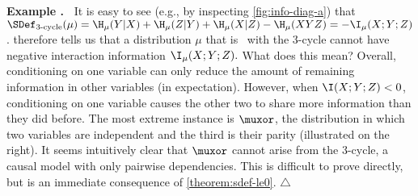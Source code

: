     \label{example:nonneg-ii}
\textbf{Example \theexample.~}
It is easy to see 
(e.g., by inspecting \cref{fig:info-diag-a}) 
that
$\SDef_{\text{3-cycle}}(\mu) = 
    \H_\mu(Y|X) + \H_\mu(Z|Y) + \H_\mu(X|Z) - \H_\mu(XYZ)
    =
    -\I_\mu(X;Y;Z)$.
%
%
 therefore tells us that 
a
distribution
    $\mu$ that is \scible\ 
    with the 3-cycle 
    cannot have negative interaction information
$
    \I_\mu(X; Y; Z)
        . 
$
What does this mean?
Overall, 
conditioning on
one variable can only reduce the amount of 
remaining information in other 
variables (in expectation).
However, when $\I(X;Y;Z) < 0$, 
conditioning on
one variable causes the other two to share more information than they did before. 
The most extreme instance is $\muxor$, the distribution in which two variables are independent and the third is their parity 
(illustrated on the right).
%
%
It seems intuitively clear that $\muxor$ cannot arise from 
the 3-cycle, a causal model with only pairwise dependencies.
This is difficult to prove directly, but is an immediate consequence of \cref{theorem:sdef-le0}.
\hfill$\triangle$
    

